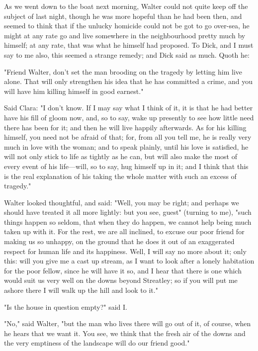 As we went down to the boat next morning, Walter could not quite keep
off the subject of last night, though he was more hopeful than he had
been then, and seemed to think that if the unlucky homicide could not be
got to go over-sea, he might at any rate go and live somewhere in the
neighbourhood pretty much by himself; at any rate, that was what he
himself had proposed. To Dick, and I must say to me also, this seemed a
strange remedy; and Dick said as much. Quoth he:

"Friend Walter, don't set the man brooding on the tragedy by letting him
live alone. That will only strengthen his idea that he has committed a
crime, and you will have him killing himself in good earnest."

Said Clara: "I don't know. If I may say what I think of it, it is that
he had better have his fill of gloom now, and, so to say, wake up
presently to see how little need there has been for it; and then he will
live happily afterwards. As for his killing himself, you need not be
afraid of that; for, from all you tell me, he is really very much in
love with the woman; and to speak plainly, until his love is satisfied,
he will not only stick to life as tightly as he can, but will also make
the most of every event of his life---will, so to say, hug himself up in
it; and I think that this is the real explanation of his taking the
whole matter with such an excess of tragedy."

Walter looked thoughtful, and said: "Well, you may be right; and perhaps
we should have treated it all more lightly: but you see, guest" (turning
to me), "such things happen so seldom, that when they do happen, we
cannot help being much taken up with it. For the rest, we are all
inclined, to excuse our poor friend for making us so unhappy, on the
ground that he does it out of an exaggerated respect for human life and
its happiness. Well, I will say no more about it; only this: will you
give me a cast up stream, as I want to look after a lonely habitation
for the poor fellow, since he will have it so, and I hear that there is
one which would suit us very well on the downs beyond Streatley; so if
you will put me ashore there I will walk up the hill and look to it."

"Is the house in question empty?" said I.

"No," said Walter, "but the man who lives there will go out of it, of
course, when he hears that we want it. You see, we think that the fresh
air of the downs and the very emptiness of the landscape will do our
friend good."

